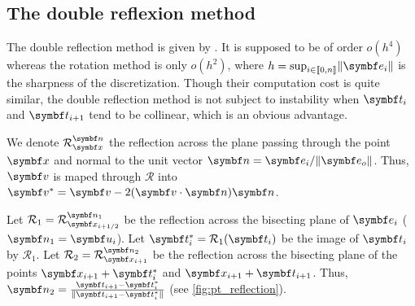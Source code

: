 
\subsection{The double reflexion method}
The double reflection method is given by . It is supposed to be of order $o(h^4)$ whereas the rotation method is only $o(h^2)$, where $h = \sup_{i\in \llbracket 0,n \rrbracket} \norm{\vect{e}_i}$ is the sharpness of the discretization. Though their computation cost is quite similar, the double reflection method is not subject to instability when $\vect{t}_i$ and $\vect{t}_{i+1}$ tend to be collinear, which is an obvious advantage.

We denote $\mathcal{R}_{\vect{x}}^{\vect{n}}$ the reflection across the plane passing through the point $\vect{x}$ and normal to the unit vector $\vect{n} = \vect{e}_i / \norm{\vect{e}_o}$. Thus, $\vect{v}$ is maped through $\mathcal{R}$ into $\vect{v}^* = \vect{v} - 2(\vect{v}\cdot\vect{n})\vect{n}$.

Let $\mathcal{R}_{1} = \mathcal{R}_{\vect{x}_{i+1/2}}^{\vect{n}_{1}}$ be the reflection across the bisecting plane of $\vect{e}_i$ ($\vect{n}_{1} = \vect{u}_i$).
Let $\vect{t}_i^* = \mathcal{R}_{1}(\vect{t}_i)$ be the image of $\vect{t}_i$ by $\mathcal{R}_{1}$.
Let $\mathcal{R}_{2} = \mathcal{R}_{\vect{x}_{i+1}}^{\vect{n}_{2}}$ be the reflection across the bisecting plane of the points $\vect{x}_{i+1} + \vect{t}_i^*$ and $\vect{x}_{i+1} + \vect{t}_{i+1}$. 
Thus, $\vect{n}_{2} = \frac{ \vect{t}_{i+1} - \vect{t}_i^*}{\norm{\vect{t}_{i+1} - \vect{t}_i^*}}$ (see \cref{fig:pt_reflection}).

